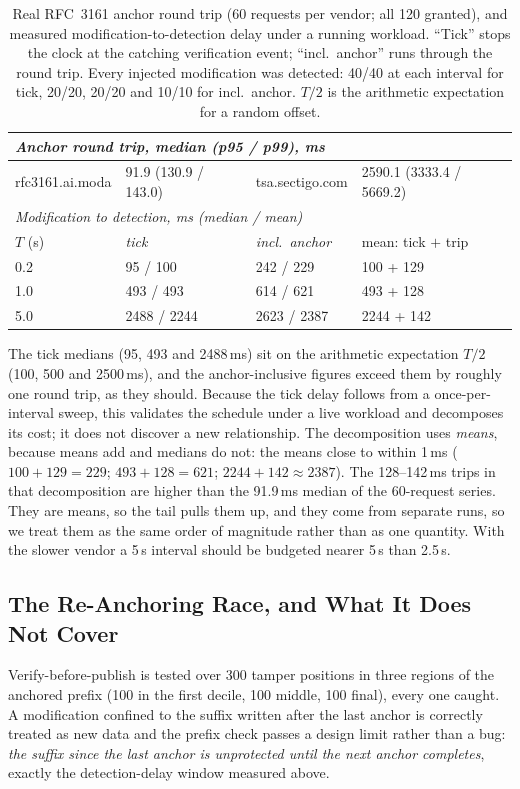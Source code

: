 \documentclass[conference]{IEEEtran}
\begin{document}
\begin{table}[t]
\caption{Real RFC~3161 anchor round trip (60 requests per vendor; all 120 granted), and
measured modification-to-detection delay under a running workload. ``Tick'' stops the clock at the
catching verification event; ``incl.\ anchor'' runs through the round trip. Every injected
modification was detected: 40/40 at each interval for tick, 20/20, 20/20 and 10/10 for
incl.\ anchor. $T/2$ is the arithmetic expectation for a random offset.}
\label{tab:anchor}
\centering
\scriptsize
\begin{tabular}{llll}
\toprule
\multicolumn{4}{l}{\textit{Anchor round trip, median (p95 / p99), ms}} \\
\midrule
rfc3161.ai.moda & 91.9 (130.9 / 143.0) & tsa.sectigo.com & 2590.1 (3333.4 / 5669.2) \\
\midrule
\multicolumn{4}{l}{\textit{Modification to detection, ms (median / mean)}} \\
\midrule
$T$ (s) & \textit{tick} & \textit{incl.\ anchor} & mean: tick $+$ trip \\
\midrule
0.2 & 95 / 100 & 242 / 229 & 100 + 129 \\
1.0 & 493 / 493 & 614 / 621 & 493 + 128 \\
5.0 & 2488 / 2244 & 2623 / 2387 & 2244 + 142 \\
\bottomrule
\end{tabular}
\end{table}

The tick medians (95, 493 and 2488\,ms) sit on the arithmetic expectation $T/2$ (100, 500 and 2500\,ms), and
the anchor-inclusive figures exceed them by roughly one round trip, as they should. Because the tick delay
follows from a once-per-interval sweep, this validates the schedule under a live workload and decomposes its
cost; it does not discover a new relationship. The decomposition uses \emph{means}, because means add and
medians do not: the means close to within 1\,ms ($100+129=229$; $493+128=621$; $2244+142\approx2387$). The
128--142\,ms trips in that decomposition are higher than the 91.9\,ms median of the 60-request series. They are
means, so the tail pulls them up, and they come from separate runs, so we treat them as the same order of
magnitude rather than as one quantity. With the slower vendor a 5\,s interval should be budgeted nearer 5\,s
than 2.5\,s.

\subsection{The Re-Anchoring Race, and What It Does Not Cover}
\label{sec:race}
Verify-before-publish is tested over 300 tamper positions in three regions of the anchored prefix (100 in
the first decile, 100 middle, 100 final), every one caught. A modification confined to the suffix written
after the last anchor is correctly treated as new data and the prefix check passes a design limit rather
than a bug: \emph{the suffix since the last anchor is unprotected until the next anchor completes}, exactly
the detection-delay window measured above.
\end{document}
